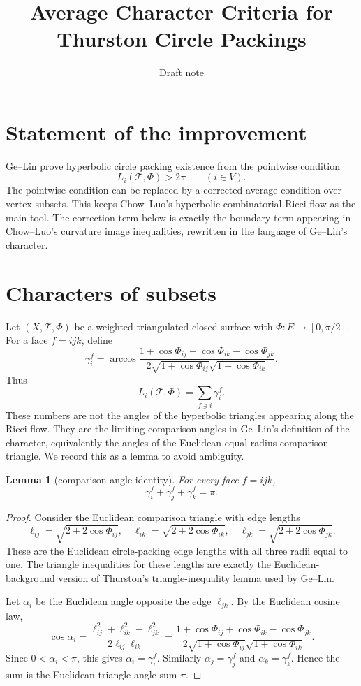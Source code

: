\documentclass[11pt]{article}
\title{Average Character Criteria for Thurston Circle Packings}
\author{Draft note}
\date{}
\newtheorem{lemma}[theorem]{Lemma}
\newcommand{\T}{\mathcal T}
\newcommand{\Phiw}{\Phi}
\begin{document}
\maketitle

\section{Statement of the improvement}

Ge--Lin prove hyperbolic circle packing existence from the pointwise
condition
\[
  L_i(\T,\Phiw)>2\pi \qquad (i\in V).
\]
The pointwise condition can be replaced by a corrected average condition
over vertex subsets.  This keeps Chow--Luo's hyperbolic combinatorial Ricci
flow as the main tool.  The correction term below is exactly the boundary
term appearing in Chow--Luo's curvature image inequalities, rewritten in
the language of Ge--Lin's character.

\section{Characters of subsets}

Let $(X,\T,\Phiw)$ be a weighted triangulated closed surface with
$\Phiw:E\to[0,\pi/2]$.  For a face $f=ijk$, define
\[
  \gamma_i^f
  =
  \arccos
  \frac{1+\cos\Phiw_{ij}+\cos\Phiw_{ik}-\cos\Phiw_{jk}}
       {2\sqrt{1+\cos\Phiw_{ij}}\sqrt{1+\cos\Phiw_{ik}}}.
\]
Thus
\[
  L_i(\T,\Phiw)=\sum_{f\ni i}\gamma_i^f .
\]
These numbers are not the angles of the hyperbolic triangles appearing
along the Ricci flow.  They are the limiting comparison angles in
Ge--Lin's definition of the character, equivalently the angles of the
Euclidean equal-radius comparison triangle.  We record this as a lemma to
avoid ambiguity.

\begin{lemma}[comparison-angle identity]\label{lem:comparison-angle}
For every face $f=ijk$,
\[
  \gamma_i^f+\gamma_j^f+\gamma_k^f=\pi .
\]
\end{lemma}

\begin{proof}
Consider the Euclidean comparison triangle with edge lengths
\[
  \ell_{ij}=\sqrt{2+2\cos\Phiw_{ij}},\quad
  \ell_{ik}=\sqrt{2+2\cos\Phiw_{ik}},\quad
  \ell_{jk}=\sqrt{2+2\cos\Phiw_{jk}}.
\]
These are the Euclidean circle-packing edge lengths with all three radii
equal to one.  The triangle inequalities for these lengths are exactly the
Euclidean-background version of Thurston's triangle-inequality lemma used
by Ge--Lin.

Let $\alpha_i$ be the Euclidean angle opposite the edge $\ell_{jk}$.
By the Euclidean cosine law,
\[
 \cos \alpha_i
 =
 \frac{\ell_{ij}^2+\ell_{ik}^2-\ell_{jk}^2}{2\ell_{ij}\ell_{ik}}
 =
 \frac{1+\cos\Phiw_{ij}+\cos\Phiw_{ik}-\cos\Phiw_{jk}}
      {2\sqrt{1+\cos\Phiw_{ij}}\sqrt{1+\cos\Phiw_{ik}}}.
\]
Since $0<\alpha_i<\pi$, this gives $\alpha_i=\gamma_i^f$.  Similarly
$\alpha_j=\gamma_j^f$ and $\alpha_k=\gamma_k^f$.  Hence the sum is the
Euclidean triangle angle sum $\pi$.
\end{proof}
\end{document}
